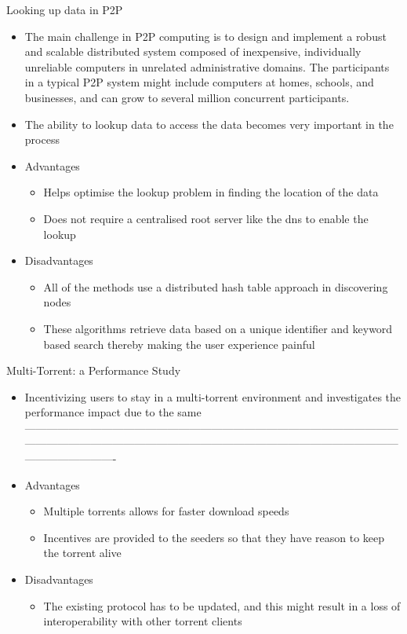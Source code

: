 \documentclass[9pt]{beamer}
\begin{document}
\begin{frame}{Looking up data in P2P}
    \begin{itemize}
        \item The main challenge in P2P computing is to design and implement a robust and scalable distributed system composed of inexpensive, individually unreliable computers in unrelated administrative domains. The participants in a typical P2P system might include computers at homes, schools, and businesses, and can grow to several million concurrent participants.
        \item The ability to lookup data to access the data becomes very important in the process
        \item Advantages
        \begin{itemize}
            \item Helps optimise the lookup problem in finding the location of the data
\item Does not require a centralised root server like the dns to enable the lookup 

        \end{itemize}
        \item Disadvantages
        \begin{itemize}
            \item All of the methods use a distributed hash table approach in discovering nodes
\item These algorithms retrieve data based on a unique identifier and keyword based search thereby making the user experience painful
        \end{itemize}
    \end{itemize}
\end{frame}


\begin{frame}{Multi-Torrent: a Performance Study}
    \begin{itemize}
        \item Incentivizing users to stay in a multi-torrent environment and investigates the performance impact due to the same
-------------------------------------------------------------------------------------------------------------------------------------------------------------------------------------------------------------------------------------        \item Advantages
        \begin{itemize}
            \item Multiple torrents allows for faster download speeds
            \item Incentives are provided to the seeders so that they have reason to keep the torrent alive
        \end{itemize}
        \item Disadvantages
        \begin{itemize}
            \item The existing protocol has to be updated, and this might result in a loss of interoperability with other torrent clients
        \end{itemize}
    \end{itemize}
\end{frame}
\end{document}
